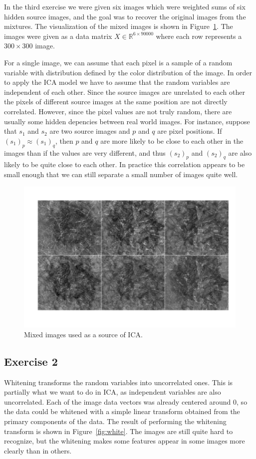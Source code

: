 \documentclass{article}
\begin{document}
In the third exercise we were given six images which were weighted sums of six hidden source images, and the goal was to recover the original images from the mixtures.
The visualization of the mixed images is shown in Figure~\ref{fig:mixed}. The images were given as a data matrix $X\in\mathbb{R}^{6\times 90000}$ where each row represents a $300\times 300$ image.

For a single image, we can assume that each pixel is a sample of a random variable with distribution defined by the color distribution of the image.
In order to apply the ICA model we have to assume that the random variables are independent of each other.
Since the source images are unrelated to each other the pixels of different source images at the same position are not directly correlated.
However, since the pixel values are not truly random, there are usually some hidden depencies between real world images.
For instance, suppose that $s_1$ and $s_2$ are two source images and $p$ and $q$ are pixel positions.
If $(s_1)_p\approx(s_1)_q$, then $p$ and $q$ are more likely to be close to each other in the images than if the values are very different, and thus $(s_2)_p$ and $(s_2)_q$ are also likely to be quite close to each other.
In practice this correlation appears to be small enough that we can still separate a small number of images quite well.

\newcommand\iscale{0.45}
\begin{figure}\centering
	\includegraphics[scale=\iscale]{mixed}
	\caption{Mixed images used as a source of ICA.}\label{fig:mixed}
\end{figure}

\subsection{Exercise 2}
Whitening transforms the random variables into uncorrelated ones.
This is partially what we want to do in ICA, as independent variables are also uncorrelated.
Each of the image data vectors was already centered around 0, so the data could be whitened with a simple linear transform obtained from the primary components of the data.
The result of performing the whitening transform is shown in Figure~\ref{fig:white}.
The images are still quite hard to recognize, but the whitening makes some features appear in some images more clearly than in others.
\end{document}
